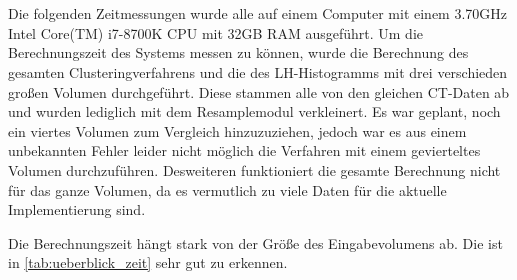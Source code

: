\chapter{}
\label{sec:results}



Die folgenden Zeitmessungen wurde alle auf einem Computer mit einem 3.70GHz  Intel Core(TM) i7-8700K CPU mit 32GB RAM ausgeführt.
Um die Berechnungszeit des Systems messen zu können, wurde die Berechnung des gesamten Clusteringverfahrens und die des LH-Histogramms mit drei verschieden großen Volumen durchgeführt. Diese stammen alle von den gleichen CT-Daten ab und wurden lediglich  mit dem Resamplemodul verkleinert. Es war geplant, noch ein viertes Volumen zum Vergleich hinzuzuziehen, jedoch war es aus einem unbekannten Fehler leider nicht möglich die Verfahren mit einem gevierteltes Volumen durchzuführen. Desweiteren funktioniert die gesamte Berechnung nicht für das ganze Volumen, da es vermutlich zu viele Daten für die aktuelle Implementierung sind.

Die Berechnungszeit hängt stark von der Größe des Eingabevolumens ab. Die ist in \autoref{tab:ueberblick_zeit} sehr gut zu erkennen.


\begin{table}[h]
\centering
{}
\caption{Überblick über die Berechnungszeiten der verschiedenen Volumengrößen}
\label{tab:ueberblick_zeit}
\end{table}


